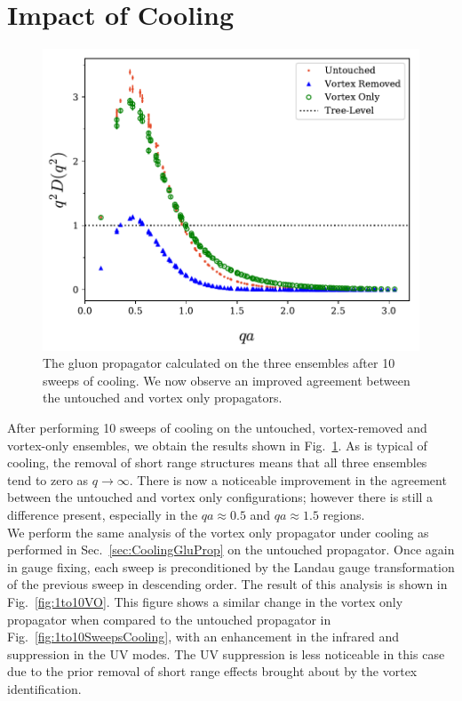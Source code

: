 \section{Impact of Cooling}

\begin{figure}[tb]
\centering
\includegraphics[width=\linewidth]{./ScalarGluComp_q2_10sweepsAll.pdf}
\caption{\label{fig:10SweepsCooling}The gluon propagator calculated on the three ensembles after 10 sweeps of cooling. We now observe an improved agreement between the untouched and vortex only propagators.}
\end{figure}  
%
After performing 10 sweeps of cooling on the untouched, vortex-removed and vortex-only ensembles, we obtain the results shown in Fig.~\ref{fig:10SweepsCooling}. As is typical of cooling, the removal of short range structures means that all three ensembles tend to zero as $q\rightarrow\infty$. There is now a noticeable improvement in the agreement between the untouched and vortex only configurations; however there is still a difference present, especially in the $qa\approx0.5$ and $qa\approx1.5$ regions.\\

We perform the same analysis of the vortex only propagator under cooling as performed in Sec.~\ref{sec:CoolingGluProp} on the untouched propagator. Once again in gauge fixing, each sweep is preconditioned by the Landau gauge transformation of the previous sweep in descending order. The result of this analysis is shown in Fig.~\ref{fig:1to10VO}. This figure shows a similar change in the vortex only propagator when compared to the untouched propagator in Fig.~\ref{fig:1to10SweepsCooling}, with an enhancement in the infrared and suppression in the UV modes. The UV suppression is less noticeable in this case due to the prior removal of short range effects brought about by the vortex identification.\\

